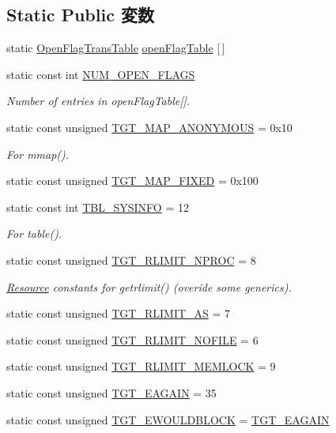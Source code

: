 \subsection*{Static Public 変数}
\begin{DoxyCompactItemize}
\item 
static \hyperlink{structOpenFlagTransTable}{OpenFlagTransTable} \hyperlink{classAlphaLinux_ab1db5a531609b99b262cc849ea24765a}{openFlagTable} \mbox{[}$\,$\mbox{]}
\item 
static const int \hyperlink{classAlphaLinux_ad85b9918c8f2c8739537a002dc1dc526}{NUM\_\-OPEN\_\-FLAGS}
\begin{DoxyCompactList}\small\item\em Number of entries in openFlagTable\mbox{[}\mbox{]}. \item\end{DoxyCompactList}\item 
static const unsigned \hyperlink{classAlphaLinux_a0bbc267200567dd98250b99b6085a499}{TGT\_\-MAP\_\-ANONYMOUS} = 0x10
\begin{DoxyCompactList}\small\item\em For mmap(). \item\end{DoxyCompactList}\item 
static const unsigned \hyperlink{classAlphaLinux_a0124e421d7846143bca15728b7a53e14}{TGT\_\-MAP\_\-FIXED} = 0x100
\item 
static const int \hyperlink{classAlphaLinux_a02a979126f2aa34bcdfdc6ab92207d3b}{TBL\_\-SYSINFO} = 12
\begin{DoxyCompactList}\small\item\em For table(). \item\end{DoxyCompactList}\item 
static const unsigned \hyperlink{classAlphaLinux_af16b609dcc51ebef365e8258e28d777c}{TGT\_\-RLIMIT\_\-NPROC} = 8
\begin{DoxyCompactList}\small\item\em \hyperlink{classResource}{Resource} constants for getrlimit() (overide some generics). \item\end{DoxyCompactList}\item 
static const unsigned \hyperlink{classAlphaLinux_a6e372e5f43e2da816e9bbf5088d89c21}{TGT\_\-RLIMIT\_\-AS} = 7
\item 
static const unsigned \hyperlink{classAlphaLinux_a7eca1a56bf2a00dce74320c95a0b176e}{TGT\_\-RLIMIT\_\-NOFILE} = 6
\item 
static const unsigned \hyperlink{classAlphaLinux_acfa2b204cbb5bca2fbc2c1f15649aca2}{TGT\_\-RLIMIT\_\-MEMLOCK} = 9
\item 
static const unsigned \hyperlink{classAlphaLinux_aefc7de6c39dd68b971f1fe2c797acd04}{TGT\_\-EAGAIN} = 35
\item 
static const unsigned \hyperlink{classAlphaLinux_ad8327bcce81f6ea29f92e6422808bbdd}{TGT\_\-EWOULDBLOCK} = \hyperlink{classAlphaLinux_aefc7de6c39dd68b971f1fe2c797acd04}{TGT\_\-EAGAIN}
\end{DoxyCompactItemize}
